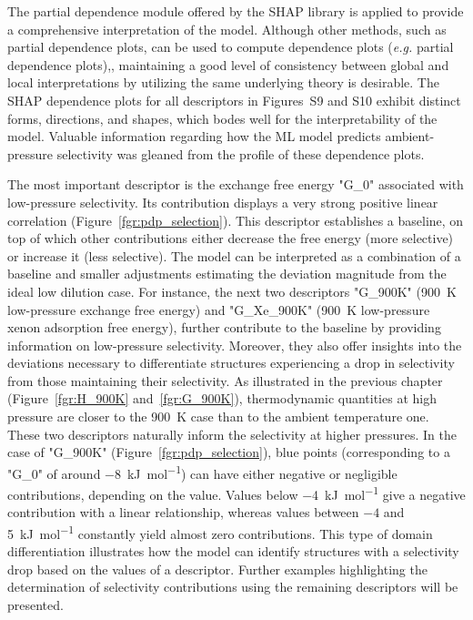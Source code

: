 \documentclass[main]{subfiles}
\begin{document}
The partial dependence module offered by the SHAP library is applied to provide a comprehensive interpretation of the model. Although other methods, such as partial dependence plots, can be used to compute dependence plots (\emph{e.g.} partial dependence plots),\autocite{molnar2020interpretable}, maintaining a good level of consistency between global and local interpretations by utilizing the same underlying theory is desirable. The SHAP dependence plots for all descriptors in Figures~S9 and S10 exhibit distinct forms, directions, and shapes, which bodes well for the interpretability of the model. Valuable information regarding how the ML model predicts ambient-pressure selectivity was gleaned from the profile of these dependence plots.

The most important descriptor is the exchange free energy "G\_0" associated with low-pressure selectivity. Its contribution displays a very strong positive linear correlation (Figure~\ref{fgr:pdp_selection}). This descriptor establishes a baseline, on top of which other contributions either decrease the free energy (more selective) or increase it (less selective). The model can be interpreted as a combination of a baseline and smaller adjustments estimating the deviation magnitude from the ideal low dilution case. For instance, the next two descriptors "G\_900K" (\SI{900}{\kelvin} low-pressure exchange free energy) and "G\_Xe\_900K" (\SI{900}{\kelvin} low-pressure xenon adsorption free energy), further contribute to the baseline by providing information on low-pressure selectivity. Moreover, they also offer insights into the deviations necessary to differentiate structures experiencing a drop in selectivity from those maintaining their selectivity. As illustrated in the previous chapter (Figure~\ref{fgr:H_900K} and~\ref{fgr:G_900K}), thermodynamic quantities at high pressure are closer to the \SI{900}{\kelvin} case than to the ambient temperature one. These two descriptors naturally inform the selectivity at higher pressures. In the case of "G\_900K" (Figure~\ref{fgr:pdp_selection}), blue points (corresponding to a "G\_0" of around \SI{-8}{\kilo\joule\per\mole}) can have either negative or negligible contributions, depending on the value. Values below \SI{-4}{\kilo\joule\per\mole} give a negative contribution with a linear relationship, whereas values between $-4$ and \SI{5}{\kilo\joule\per\mole} constantly yield almost zero contributions. This type of domain differentiation illustrates how the model can identify structures with a selectivity drop based on the values of a descriptor. Further examples highlighting the determination of selectivity contributions using the remaining descriptors will be presented.
\end{document}

